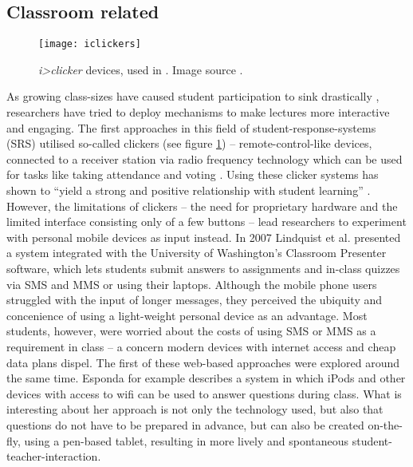 \subsection{Classroom related}

\begin{figure}
\centering
\texttt{[image: iclickers]}
\caption{\emph{i>clicker} devices, used in \cite{Chamillard:StudentResponseSystem}. Image source \cite{iclicker}.}
\label{fig:related-work-iclicker}
\end{figure}

As growing class-sizes have caused student participation to sink drastically \cite{Bry:Backstage}, researchers have tried to deploy mechanisms to make lectures more interactive and engaging. The first ap\-proa\-ches in this field of student-response-systems (SRS) utilised so-called clickers (see figure \ref{fig:related-work-iclicker}) -- remote-control-like devices, connected to a receiver station via radio frequency technology \cite{cuclickers:faq} which can be used for tasks like taking attendance and voting \cite{Chamillard:StudentResponseSystem}. Using these clicker systems has shown to ``yield a strong and positive relationship with student learning'' \cite{Chamillard:StudentResponseSystem}. However, the limitations of clickers -- the need for proprietary hardware and the limited interface consisting only of a few buttons -- lead researchers to experiment with personal mobile devices as input instead. In 2007 Lindquist et al. \cite{Lindquist:ExploringMobilePhonesActiveLearning} presented a system integrated with the University of Washington's Classroom Presenter software, which lets students submit answers to assignments and in-class quizzes via SMS and MMS or using their laptops. Although the mobile phone users struggled with the input of longer messages, they perceived the ubiquity and concenience of using a light-weight personal device as an advantage. Most students, however, were worried about the costs of using SMS or MMS as a requirement in class -- a concern modern devices with internet access and cheap data plans dispel. The first of these web-based approaches were explored around the same time. Esponda \cite{Esponda:ElectronicVotingOnTheFly} for example describes a system in which iPods and other devices with access to wifi can be used to answer questions during class. What is interesting about her approach is not only the technology used, but also that questions do not have to be prepared in advance, but can also be created on-the-fly, using a pen-based tablet, resulting in more lively and spontaneous student-teacher-interaction.
